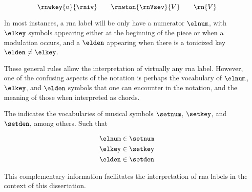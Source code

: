 \begin{equation}
    \label{eq:rn_three_annotations}
    \rnwkey{a}{\rniv} \qquad \rnwton{\rnVsev}{V} \qquad \rn{V}
\end{equation}


In most instances, a \gls{rna} label will be only have a
numerator $\elnum$, with $\elkey$ symbols appearing either
at the beginning of the piece or when a modulation occurs,
and a $\elden$ appearing when there is a tonicized key
$\elden \neq \elkey$.

These general rules allow the interpretation of virtually
any \gls{rna} label. However, one of the confusing aspects
of the notation is perhaps the vocabulary of $\elnum$,
$\elkey$, and $\elden$ symbols that one can encounter in the
notation, and the meaning of those when interpreted as
chords.

The 
indicates the vocabularies of musical symbols $\setnum$,
$\setkey$, and $\setden$, among others. Such that

\begin{equation}
    \begin{split}
    \elnum \in \setnum \\
    \elkey \in \setkey \\
    \elden \in \setden
    \end{split}
\end{equation}

This complementary information facilitates the
interpretation of \gls{rna} labels in the context of this
dissertation.
